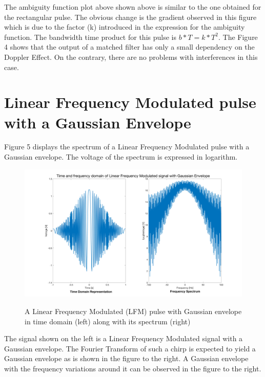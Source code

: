 \noindent The ambiguity function plot above shown above is similar to the one obtained for the rectangular pulse. The obvious change is the gradient observed in this figure which is due to the factor (k) introduced in the expression for the ambiguity function. The bandwidth time product for this pulse is $b * T = k * T^{2}$. The Figure 4 shows that the output of a matched filter has only a small dependency on the Doppler Effect. On the contrary, there are no problems with interferences in this case.
\newpage

\section*{Linear Frequency Modulated pulse with a Gaussian Envelope } 

\noindent Figure 5 displays the spectrum of a Linear Frequency Modulated pulse with a Gaussian envelope. The voltage of the spectrum is expressed in logarithm.

\begin{figure}[H]
\centering
{\includegraphics[scale=0.18]{usp8_3.png}}
\caption{ A Linear Frequency Modulated (LFM) pulse with Gaussian envelope in time domain (left) along with its spectrum (right)}
\end{figure}

\noindent The signal shown on the left is a Linear Frequency Modulated signal with a Gaussian envelope. The Fourier Transform of such a chirp is expected to yield a Gaussian envelope as is shown in the figure to the right. A Gaussian envelope with the frequency variations around it can be observed in the figure to the right.

